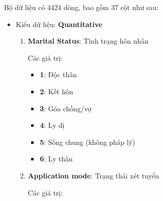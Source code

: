     \FloatBarrier

    Bộ dữ liệu có 4424 dòng, bao gồm 37 cột như sau:
    \begin{itemize}
        \item Kiểu dữ liệu: \textbf{Quantitative} 

        \begin{enumerate}
            \item \textbf{Marital Status}: Tình trạng hôn nhân

            Các giá trị:

            \begin{itemize}
              \item \textbf{1}: Độc thân
              \item \textbf{2}: Kết hôn
              \item \textbf{3}: Góa chồng/vợ
              \item \textbf{4}: Ly dị
              \item \textbf{5}: Sống chung (không pháp lý)
              \item \textbf{6}: Ly thân
            \end{itemize}

            \item \textbf{Application mode}: Trạng thái xét tuyển

            Các giá trị:
            

\end{enumerate}
\end{itemize}
